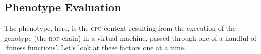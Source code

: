 




\subsection{Phenotype Evaluation}
The phenotype, here, is the \textsc{cpu} context resulting from the execution of the genotype (the \textsc{rop}-chain) in a virtual machine, passed through one of a handful of `fitness functions'. Let's look at these factors one at a time. 
